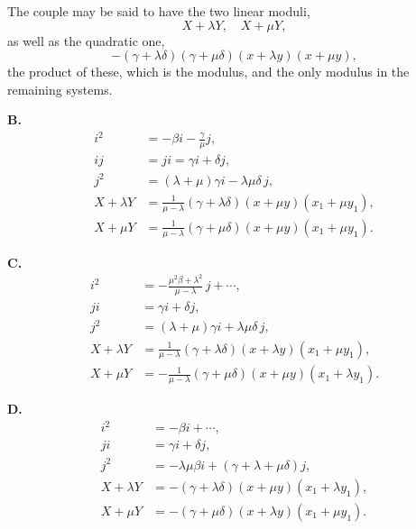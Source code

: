 \documentclass[12pt,a4paper]{article}
\begin{document}
\newpage
\setcounter{page}{129}

The couple may be said to have the two linear moduli,
\[
X + \lambda Y,\quad X + \mu Y,
\]
as well as the quadratic one,
\[
-(\gamma + \lambda\delta)(\gamma + \mu\delta)(x + \lambda y)(x + \mu y),
\]
the product of these, which is the modulus, and the only modulus in the remaining systems.

\medskip
\textbf{B.}
\begin{align*}
i^2 &= -\beta i - \tfrac{\gamma}{\mu}j,\\
ij &= ji = \gamma i + \delta j,\\
j^2 &= (\lambda + \mu)\gamma i - \lambda\mu\delta\, j,\\
X + \lambda Y &= \tfrac{1}{\mu-\lambda}(\gamma + \lambda\delta)(x + \mu y)(x_1 + \mu y_1),\\
X + \mu Y &= \tfrac{1}{\mu-\lambda}(\gamma + \mu\delta)(x + \mu y)(x_1 + \mu y_1).
\end{align*}

\medskip
\textbf{C.}
\begin{align*}
i^2 &= -\tfrac{\mu^2\beta + \lambda^2}{\mu - \lambda}\,j + \cdots,\\
ji &= \gamma i + \delta j,\\
j^2 &= (\lambda + \mu)\gamma i + \lambda\mu\delta\, j,\\
X + \lambda Y &= \tfrac{1}{\mu-\lambda}(\gamma + \lambda\delta)(x + \lambda y)(x_1 + \mu y_1),\\
X + \mu Y &= -\tfrac{1}{\mu-\lambda}(\gamma + \mu\delta)(x + \mu y)(x_1 + \lambda y_1).
\end{align*}

\medskip
\textbf{D.}
\begin{align*}
i^2 &= -\beta i + \cdots,\\
ji &= \gamma i + \delta j,\\
j^2 &= -\lambda\mu\beta i + (\gamma + \lambda + \mu\delta)j,\\
X + \lambda Y &= -(\gamma + \lambda\delta)(x + \mu y)(x_1 + \lambda y_1),\\
X + \mu Y &= -(\gamma + \mu\delta)(x + \lambda y)(x_1 + \mu y_1).
\end{align*}

\newpage
\setcounter{page}{130}
\end{document}
